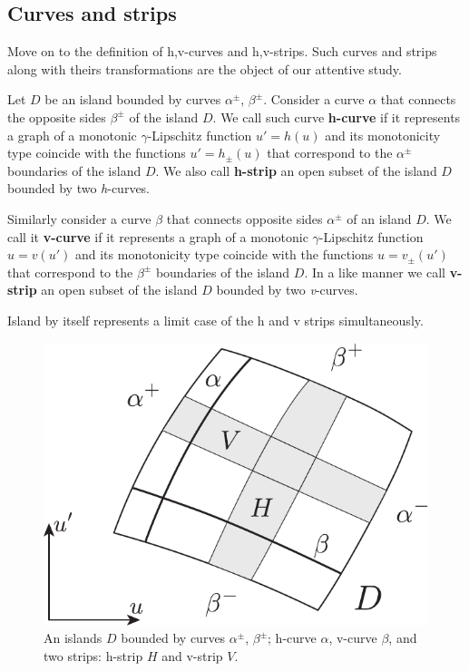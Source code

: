 \subsection{Curves and strips}

Move on to the definition of h,v-curves and h,v-strips.
Such curves and strips along with theirs transformations are the object of our attentive study.

\begin{definition}
	Let $D$ be an island bounded by curves $\alpha^{\pm}$, $\beta^{\pm}$.
	Consider a curve $\alpha$ that connects the opposite sides $\beta^{\pm}$ of the island $D$. 
	We call such curve {\bf h-curve} if it represents a graph of a monotonic $\gamma$-Lipschitz function $u' = h(u)$ and its monotonicity type coincide with the functions $u' = h_{\pm}(u)$ that correspond to the $\alpha^{\pm}$ boundaries of the island $D$.
	We also call {\bf h-strip} an open subset of the island $D$ bounded by two \emph{h}-curves.
\end{definition}

\begin{definition}
	Similarly consider a curve $\beta$ that connects opposite sides $\alpha^{\pm}$ of an island $D$.
	We call it {\bf v-curve} if it represents a graph of a monotonic $\gamma$-Lipschitz function $u = v(u')$ and its monotonicity type coincide with the functions $u = v_{\pm}(u')$ that correspond to the $\beta^{\pm}$ boundaries of the island $D$.
	In a like manner we call {\bf v-strip} an open subset of the island $D$ bounded by two \emph{v}-curves.
\end{definition}

\begin{remark}
	Island by itself represents a limit case of the h and v strips simultaneously.
\end{remark}

\begin{figure}[h]
\centering
	\includegraphics[scale = 1]{pic/curves and strips}
	\caption{An islands $D$ bounded by curves $\alpha^{\pm}$, $\beta^{\pm}$; h-curve $\alpha$, v-curve $\beta$, and two strips: h-strip $H$ and v-strip $V$.}
\label{fig:curves-and-strips}
\end{figure}

